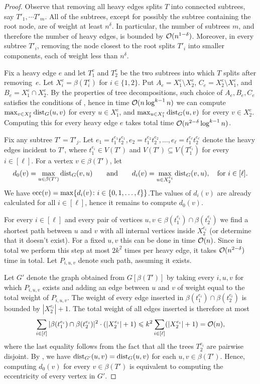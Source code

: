 \begin{proof}
Observe that
removing all heavy edges splits $T$ into connected subtrees, say $T'_1, \cdots T'_m$. All of the subtrees, except for possibly the subtree containing the root node, are of weight at least $n^\delta$. In particular, the number of subtrees $m$, and therefore the number of heavy edges, is  bounded by $\mathcal{O}(n^{1 - \delta})$. Moreover, in every subtree $T'_i$, removing the node closest to the root splits $T'_i$ into smaller components, each of weight less than $n^\delta$.

Fix a heavy edge $e$ and let $T^e_1$ and $T^e_2$ be the two subtrees into which $T$ splits after removing~$e$. Let $X^e_i = \beta(T^e_i)$ for $i \in \{1, 2\}$. Put $A_e = X^e_1 \setminus X^e_2$, $C_e = X^e_2 \setminus X^e_1$, and $B_e = X^e_1 \cap X^e_2$. By the properties of tree decompositions, such choice of $A_e, B_e, C_e$ satisfies the conditions of , hence in time $\mathcal{O}(n \log^{k - 1} n)$ we can compute $\max_{v \in X^e_2} \mathrm{dist}_G(u,v)$ for every $u \in X^e_1$, and $\max_{u \in X^e_1} \mathrm{dist}_G(u,v)$ for every $v \in X^e_2$. Computing this for every heavy edge $e$ takes total time $\mathcal{O}(n^{2 - \delta} \log^{k - 1} n)$.

Fix any subtree $T'=T'_j$. Let $e_1 = t^{e_1}_1t^{e_1}_2, e_2 = t^{e_2}_1 t^{e_2}_2, \dots, e_\ell = t^{e_\ell}_1 t^{e_\ell}_2$ denote the heavy edges incident to $T'$, where $t^{e_i}_1 \in V(T')$ and $V(T') \subseteq V(T_1^{e_i})$ for every $i \in [\ell]$.
For a vertex $v \in \beta(T')$, let
$$d_0(v) = \max_{u \in \beta(T')} \mathrm{dist}_G(v, u)\qquad\textrm{and}\qquad d_i(v) = \max_{u \in X_2^{e_i}}\mathrm{dist}_G(v,u),\quad\textrm{for } i \in [\ell].$$ We have $\mathrm{ecc}(v) = \max \{ d_i(v)\colon i\in \{0,1,\ldots,\ell\}\}$.The values of $d_i(v)$ are already calculated for all $i\in [\ell]$, hence it remains to compute $d_0(v)$.

For every $i \in [\ell]$ and every pair of vertices $u, v \in \beta(t^{e_i}_1) \cap \beta(t^{e_i}_2)$ we find a shortest path between $u$ and $v$ with all internal vertices inside $X^{e_i}_2$ (or determine that it doesn't exist). For a fixed $u, v$ this can be done in time $\mathcal{O}(n)$. Since in total we perform this step at most $2k^2$ times per heavy edge, it takes $\mathcal{O}(n^{2 - \delta})$ time in total. Let $P_{i, u, v}$ denote such path, assuming it exists.

Let $G'$ denote the graph obtained from $G[\beta(T')]$ by taking every $i, u, v$ for which $P_{i, u, v}$ exists and adding an edge between $u$ and $v$ of weight equal to the total weight of $P_{i, u, v}$.
The weight of every edge inserted in $\beta(t^{e_i}_1) \cap \beta(t^{e_i}_2)$ is bounded by $|X^{e_i}_2|+1$. The total weight of all edges inserted is therefore at most
$$
\sum_{i \in [\ell]} |\beta(t^{e_i}_1) \cap \beta(t^{e_i}_2)|^2 \cdot (|X^{e_i}_2|+1) \leqslant
k^2 \sum_{i \in [\ell]} (|X^{e_i}_2|+1) = \mathcal{O}(n),
$$
where the last equality follows from the fact that all the trees $T^{e_i}_2$ are pairwise disjoint.
By , we have $\mathrm{dist}_{G'}(u, v) = \mathrm{dist}_G(u, v)$ for each $u, v \in \beta(T')$. Hence, computing $d_0(v)$ for every $v \in \beta(T')$ is equivalent to computing the eccentricity of every vertex in $G'$.


\end{proof}
